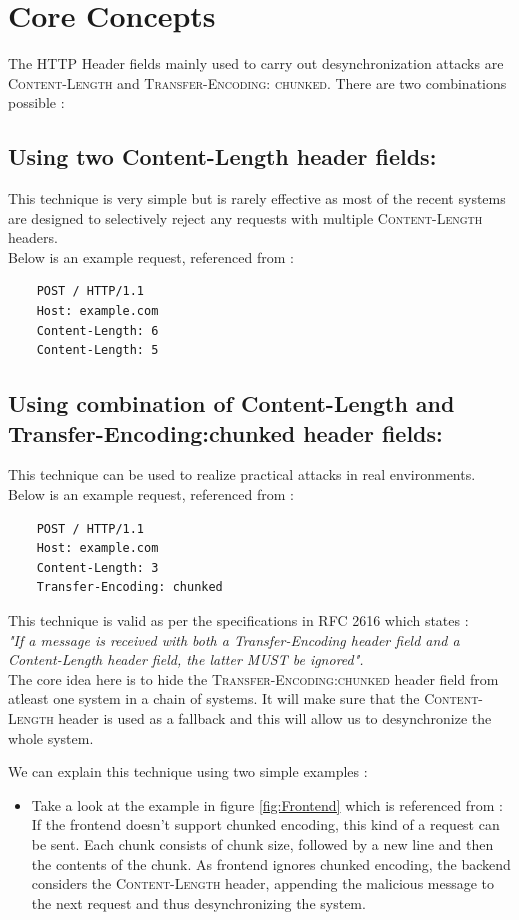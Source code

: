 \chapter{Core Concepts}
The HTTP Header fields mainly used to carry out desynchronization attacks are \textsc{Content-Length} and \textsc{Transfer-Encoding: chunked}. There are two combinations possible : 
\section{Using two Content-Length header fields:}
	This technique is very simple but is rarely effective as most of the recent systems are designed to selectively reject any requests with multiple \textsc{Content-Length} headers.\\
	Below is an example request, referenced from \cite{b6}:
	\begin{verbatim}
	POST / HTTP/1.1
	Host: example.com
	Content-Length: 6
	Content-Length: 5
	\end{verbatim}
\section{Using combination of Content-Length and Transfer-Encoding:chunked header fields:}This technique can be used to realize practical attacks in real environments. 
	Below is an example request, referenced from \cite{b6}:
	\begin{verbatim}
	POST / HTTP/1.1
	Host: example.com
	Content-Length: 3
	Transfer-Encoding: chunked
	\end{verbatim}
	This technique is valid as per the specifications in RFC 2616\cite{b10} which states : \\
	\textit{"If a message is received with both a Transfer-Encoding header field and a Content-Length header field, the latter MUST be ignored".}\\
	The core idea here is to hide the \textsc{Transfer-Encoding:chunked} header field from atleast one system in a chain of systems. It will make sure that the \textsc{Content-Length} header is used as a fallback and this will allow us to desynchronize the whole system.

We can explain this technique using two simple examples : 
\begin{itemize}
	\item Take a look at the example in figure \ref{fig:Frontend} which is referenced from \cite{b6}:
	If the frontend doesn't support chunked encoding, this kind of a request can be sent. Each chunk consists of chunk size, followed by a new line and then the contents of the chunk. As frontend ignores chunked encoding, the backend considers the \textsc{Content-Length} header, appending the malicious message to the next request and thus desynchronizing the system.
\end{itemize}

